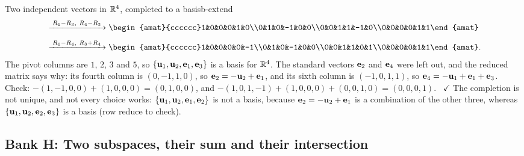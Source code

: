 \documentclass[11pt]{article}
\begin{document}
\begin{exmp}{Two independent vectors in $\mathbb{R}^4$, completed to a basis}{b-extend}
\begin{align*}
&\rops{R_1-R_3,\ R_4-R_3}
\begin{amat}{cccccc}1&0&0&0&1&0\\0&1&0&-1&0&0\\0&0&1&1&-1&0\\0&0&0&0&1&1\end{amat}\\[4pt]
&\rops{R_1-R_4,\ R_3+R_4}
\begin{amat}{cccccc}1&0&0&0&0&-1\\0&1&0&-1&0&0\\0&0&1&1&0&1\\0&0&0&0&1&1\end{amat}.
\end{align*}
The pivot columns are $1$, $2$, $3$ and $5$, so $\{\mathbf{u}_1,\mathbf{u}_2,\mathbf{e}_1,\mathbf{e}_3\}$ is a basis for $\mathbb{R}^4$. The standard vectors $\mathbf{e}_2$ and $\mathbf{e}_4$ were left out, and the reduced matrix says why: its fourth column is $(0,-1,1,0)$, so $\mathbf{e}_2=-\mathbf{u}_2+\mathbf{e}_1$, and its sixth column is $(-1,0,1,1)$, so $\mathbf{e}_4=-\mathbf{u}_1+\mathbf{e}_1+\mathbf{e}_3$. Check: $-(1,-1,0,0)+(1,0,0,0)=(0,1,0,0)$, and $-(1,0,1,-1)+(1,0,0,0)+(0,0,1,0)=(0,0,0,1)$. \ $\checkmark$ The completion is not unique, and not every choice works: $\{\mathbf{u}_1,\mathbf{u}_2,\mathbf{e}_1,\mathbf{e}_2\}$ is not a basis, because $\mathbf{e}_2=-\mathbf{u}_2+\mathbf{e}_1$ is a combination of the other three, whereas $\{\mathbf{u}_1,\mathbf{u}_2,\mathbf{e}_2,\mathbf{e}_3\}$ is a basis (row reduce to check).
\end{exmp}

\subsection*{Bank H: Two subspaces, their sum and their intersection}
\end{document}

